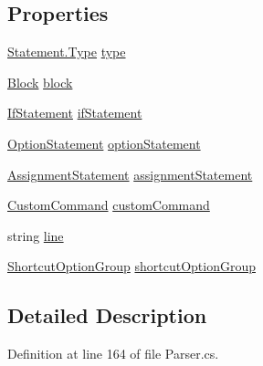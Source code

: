 \subsection*{Properties}
\begin{DoxyCompactItemize}
\item 
\hyperlink{a00166_a518000e4e6219ce5f9f4229f505cd944}{Statement.\-Type} \hyperlink{a00166_aa3fa0eb260e412720562ce06b7dc06fe}{type}
\item 
\hyperlink{a00043}{Block} \hyperlink{a00166_ac14dfc7210974b4cd86402ed011fb0b6}{block}
\item 
\hyperlink{a00118}{If\-Statement} \hyperlink{a00166_a9a71577456598af0f25b23ccd02154e4}{if\-Statement}
\item 
\hyperlink{a00146}{Option\-Statement} \hyperlink{a00166_a15020b7dab4983adbd185d5c2c2ebe84}{option\-Statement}
\item 
\hyperlink{a00039}{Assignment\-Statement} \hyperlink{a00166_a7fa97a80f1b9313bc2bd4194e3f75759}{assignment\-Statement}
\item 
\hyperlink{a00083}{Custom\-Command} \hyperlink{a00166_a8a98e7d4c66f9909da865f0e671d69f2}{custom\-Command}
\item 
string \hyperlink{a00166_a37695c7b00776bb292fd64894a70fb72}{line}
\item 
\hyperlink{a00160}{Shortcut\-Option\-Group} \hyperlink{a00166_a54d73ad69c4af4a0d61edeaea4c8ca4f}{shortcut\-Option\-Group}
\end{DoxyCompactItemize}


\subsection{Detailed Description}


Definition at line 164 of file Parser.\-cs.



